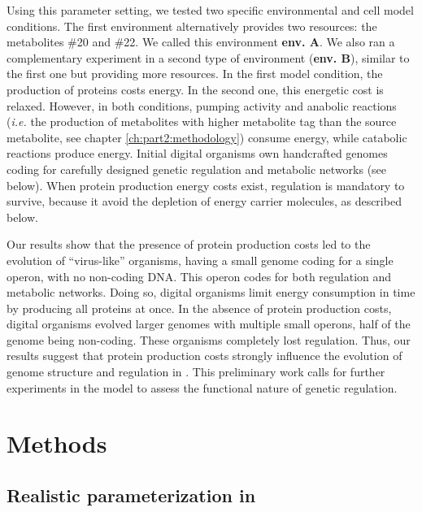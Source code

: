 Using this parameter setting, we tested two specific environmental and cell model conditions. The first environment alternatively provides two resources: the metabolites \#20 and \#22. We called this environment \textbf{env. A}. We also ran a complementary experiment in a second type of environment (\textbf{env. B}), similar to the first one but providing more resources.
In the first model condition, the production of proteins costs energy. In the second one, this energetic cost is relaxed. However, in both conditions, pumping activity and anabolic reactions (\textit{i.e.} the production of metabolites with higher metabolite tag than the source metabolite, see chapter \ref{ch:part2:methodology}) consume energy, while catabolic reactions produce energy. Initial digital organisms own handcrafted genomes coding for carefully designed genetic regulation and metabolic networks (see below). When protein production energy costs exist, regulation is mandatory to survive, because it avoid the depletion of energy carrier molecules, as described below.

Our results show that the presence of protein production costs led to the evolution of ``virus-like'' organisms, having a small genome coding for a single operon, with no non-coding DNA. This operon codes for both regulation and metabolic networks. Doing so, digital organisms limit energy consumption in time by producing all proteins at once. In the absence of protein production costs, digital organisms evolved larger genomes with multiple small operons, half of the genome being non-coding. These organisms completely lost regulation. Thus, our results suggest that protein production costs strongly influence the evolution of genome structure and regulation in {\EvoEvoSim}. This preliminary work calls for further experiments in the model to assess the functional nature of genetic regulation.


\section{Methods}
\label{sec:part2:second_result:methods}


\subsection{Realistic parameterization in {\EvoEvoSim}}
\label{subsec:part2:second_result:realistic_parameters}

